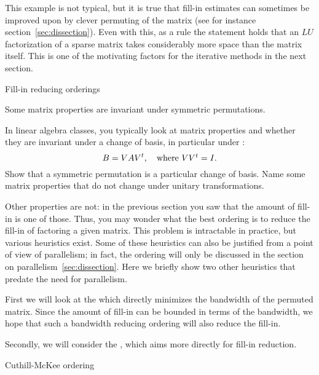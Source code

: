 This example is not typical, but it is true that fill-in
estimates can sometimes be improved upon by clever permuting
of the matrix (see for instance section~\ref{sec:dissection}).
Even with this, as a rule
the statement holds that an $LU$ factorization of a sparse
matrix takes considerably more space than the matrix itself. This is
one of the motivating factors for the iterative methods in the next
section.

 {Fill-in reducing orderings}
\label{sec:fill-ordering}

Some matrix properties are invariant under symmetric permutations.
\begin{exercise}
  In linear algebra classes, you typically look at matrix properties
  and whether they are invariant under a change of basis, in
  particular under :
  \[ B = VAV^t,\quad\hbox{where $VV^t=I$.} \]
  Show that a
  symmetric permutation is a particular change of basis. Name some
  matrix properties that do not change under unitary transformations.
\end{exercise}
Other properties are not: in the previous section you saw that the
amount of fill-in is one of those. Thus, you may wonder what the best
ordering is to reduce the fill-in of factoring a given matrix. This
problem is intractable in practice, but various heuristics exist. Some
of these heuristics can also be justified from a point of view of
parallelism; in fact, the
 ordering will only be discussed in the
section on parallelism~\ref{sec:dissection}.
Here we briefly show two other heuristics that predate the
need for parallelism.

First we will look at the  which
directly minimizes the bandwidth of the permuted matrix.
Since the amount of fill-in can be bounded in terms of the bandwidth,
we hope that such a bandwidth reducing ordering will also reduce the
fill-in.

Secondly, we will consider the ,
which aims more directly for fill-in reduction.

 {Cuthill-McKee ordering}

